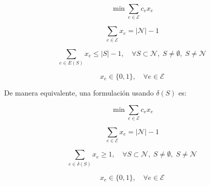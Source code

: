 \begin{itemize}
\begin{equation}
\min \sum_{e \in \mathcal{E}} c_e x_e
\end{equation}

\begin{equation}
\sum_{e \in \mathcal{E}} x_e = |\mathcal{N}| - 1
\end{equation}

\begin{equation}
\sum_{e \in E(S)} x_e \leq |S| - 1,
\quad \forall S \subset \mathcal{N},\; S \neq \emptyset,\; S \neq \mathcal{N}
\end{equation}

\begin{equation}
x_e \in \{0,1\}, \quad \forall e \in \mathcal{E}
\end{equation}

De manera equivalente, una formulación usando \(\delta(S)\) es:

\begin{equation}
\min \sum_{e \in \mathcal{E}} c_e x_e
\end{equation}

\begin{equation}
\sum_{e \in \mathcal{E}} x_e = |\mathcal{N}| - 1
\end{equation}

\begin{equation}
\sum_{e \in \delta(S)} x_e \geq 1,
\quad \forall S \subset \mathcal{N},\; S \neq \emptyset,\; S \neq \mathcal{N}
\end{equation}

\begin{equation}
x_e \in \{0,1\}, \quad \forall e \in \mathcal{E}
\end{equation}

\end{itemize}
